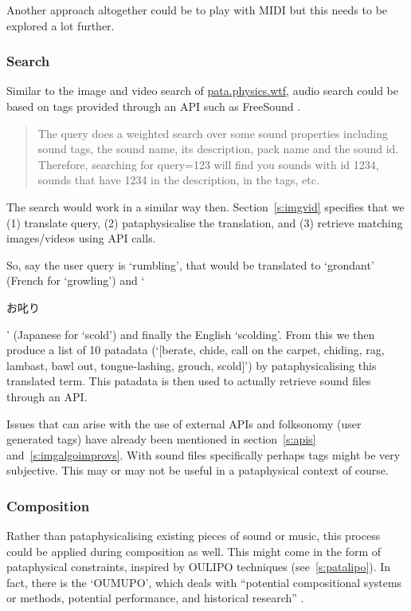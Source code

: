 Another approach altogether could be to play with \ac{MIDI} \autocite{midind} but this needs to be explored a lot further.


\subsubsection{Search}

Similar to the image and video search of \url{pata.physics.wtf}, audio search could be based on tags provided through an \ac{API} such as FreeSound \autocite{freesoundnd}. 

\begin{quotation}
  The query does a weighted search over some sound properties including sound tags, the sound name, its description, pack name and the sound id. Therefore, searching for query=123 will find you sounds with id 1234, sounds that have 1234 in the description, in the tags, etc. 
\end{quotation}

The search would work in a similar way then. Section~\ref{s:imgvid} specifies that we (1) translate query, (2) pataphysicalise the translation, and (3) retrieve matching images/videos using \ac{API} calls.

So, say the user query is `rumbling', that would be translated to `grondant' (French for `growling') and `\begin{CJK}{UTF8}{min}お叱り\end{CJK}' (Japanese for `scold') and finally the English `scolding'. From this we then produce a list of 10 patadata (`[berate, chide, call on the carpet, chiding, rag, lambast, bawl out, tongue-lashing, grouch, scold]') by pataphysicalising this translated term. This patadata is then used to actually retrieve sound files through an \ac{API}.

Issues that can arise with the use of external \ac{API}s and folksonomy (user generated tags) have already been mentioned in section~\ref{s:apis} and~\ref{s:imgalgoimprovs}. With sound files specifically perhaps tags might be very subjective. This may or may not be useful in a pataphysical context of course.


\subsubsection{Composition}
\label{s:composition}

Rather than pataphysicalising existing pieces of sound or music, this process could be applied during composition as well. This might come in the form of pataphysical constraints, inspired by \ac{OULIPO} techniques (see~\ref{s:patalipo}). In fact, there is the `OUMUPO', which deals with ``potential compositional systems or methods, potential performance, and historical research'' \autocite{Mathews2005}.


